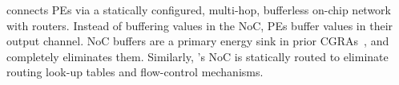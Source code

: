\riptide connects PEs via a statically configured, multi-hop, bufferless
on-chip network with routers.
%
Instead of buffering values in the NoC,
PEs buffer values in their output channel.
%
NoC buffers are a primary energy sink in prior CGRAs~\cite{karunaratne2017hycube,snafu},
and \riptide completely eliminates them.
%
Similarly, \riptide's NoC is statically routed to eliminate routing
look-up tables and flow-control mechanisms.
% 

